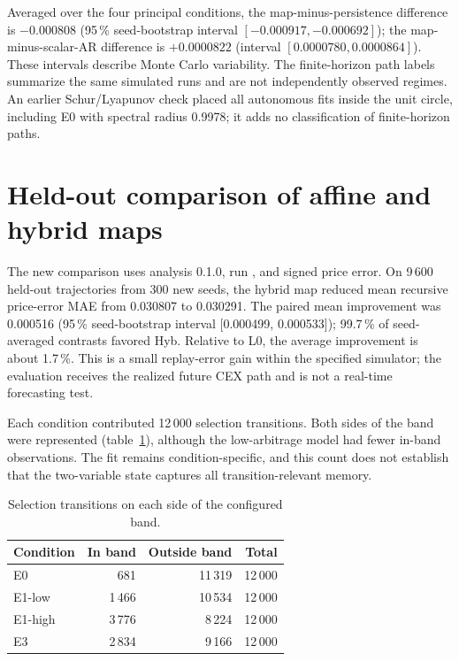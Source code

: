 Averaged over the four principal conditions, the map-minus-persistence difference is $-0.000808$ (95\,\% seed-bootstrap interval $[-0.000917,-0.000692]$); the map-minus-scalar-AR difference is $+0.0000822$ (interval $[0.0000780,0.0000864]$). These intervals describe Monte Carlo variability. The finite-horizon path labels summarize the same simulated runs and are not independently observed regimes. An earlier Schur/Lyapunov check placed all autonomous fits inside the unit circle, including E0 with spectral radius 0.9978; it adds no classification of finite-horizon paths.

\section{Held-out comparison of affine and hybrid maps}
\label{sec:hybrid-results}

The new comparison uses analysis 0.1.0, run \code{\HybridRunID}, and signed price error. On 9\,600 held-out trajectories from 300 new seeds, the hybrid map reduced mean recursive price-error MAE from 0.030807 to 0.030291. The paired mean improvement was 0.000516 (95\,\% seed-bootstrap interval [0.000499, 0.000533]); 99.7\,\% of seed-averaged contrasts favored Hyb. Relative to L0, the average improvement is about 1.7\,\%. This is a small replay-error gain within the specified simulator; the evaluation receives the realized future CEX path and is not a real-time forecasting test.

Each condition contributed 12\,000 selection transitions. Both sides of the band were represented (table~\ref{tab:hybrid-regimes}), although the low-arbitrage model had fewer in-band observations. The fit remains condition-specific, and this count does not establish that the two-variable state captures all transition-relevant memory.

\begin{table}[htbp]
\centering
\caption{Selection transitions on each side of the configured band.}
\label{tab:hybrid-regimes}
\small
\begin{tabular}{@{}lrrr@{}}
\toprule
Condition & In band & Outside band & Total \\
\midrule
E0 & 681 & 11\,319 & 12\,000 \\
E1-low & 1\,466 & 10\,534 & 12\,000 \\
E1-high & 3\,776 & 8\,224 & 12\,000 \\
E3 & 2\,834 & 9\,166 & 12\,000 \\
\bottomrule
\end{tabular}
\end{table}

